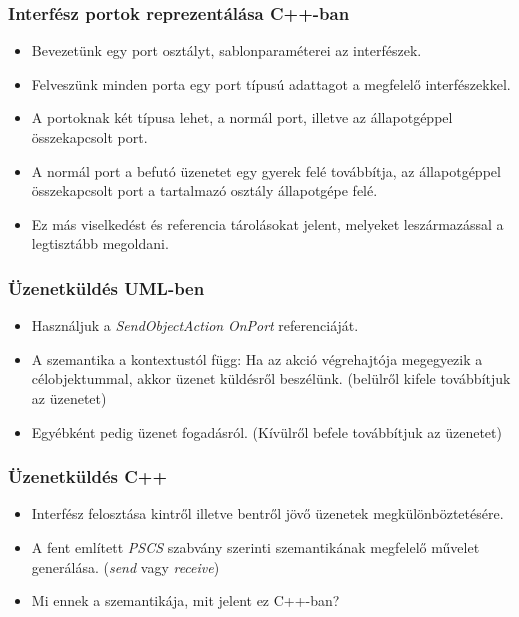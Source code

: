 \documentclass[11pt]{beamer}
\begin{document}
\begin{frame}
	\frametitle{Interfész portok reprezentálása C++-ban}
	\begin{itemize}
	\item Bevezetünk egy port osztályt, sablonparaméterei az interfészek.
	\item Felveszünk minden porta egy port típusú adattagot a megfelelő interfészekkel.
	\item A portoknak két típusa lehet, a normál port, illetve az állapotgéppel összekapcsolt port.
	\item A normál port a befutó üzenetet egy gyerek felé továbbítja, az állapotgéppel összekapcsolt port a tartalmazó osztály állapotgépe felé.
	\item Ez más viselkedést és referencia tárolásokat jelent, melyeket leszármazással a legtisztább megoldani.
	\end{itemize}

\end{frame}

\begin{frame}
	\frametitle{Üzenetküldés UML-ben}
	\begin{itemize}
	\item Használjuk a \textit{SendObjectAction} \textit{OnPort} referenciáját.
	\item A szemantika a kontextustól függ: Ha az akció végrehajtója megegyezik a célobjektummal, akkor üzenet küldésről beszélünk. (belülről kifele továbbítjuk az üzenetet)
	\item Egyébként pedig üzenet fogadásról. (Kívülről befele továbbítjuk az üzenetet)
	\end{itemize}

\end{frame}

\begin{frame}
	\frametitle{Üzenetküldés C++}
	\begin{itemize}
	\item Interfész felosztása kintről illetve bentről jövő üzenetek megkülönböztetésére.
	\item A fent említett \textit{PSCS} szabvány szerinti szemantikának megfelelő művelet generálása. (\textit{send} vagy \textit{receive})
	\item Mi ennek a szemantikája, mit jelent ez C++-ban?
	\end{itemize}
\end{frame}
\end{document}
